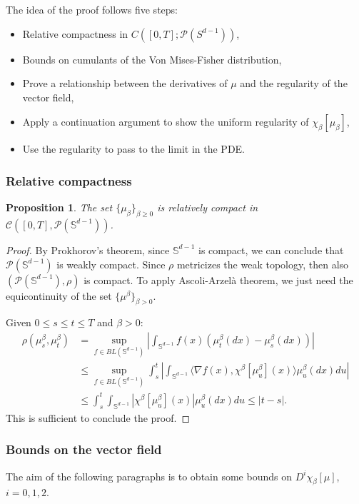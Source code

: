 \documentclass{article}
\numberwithin{theorem}{section}
\newtheorem{proposition}[theorem]{Proposition}
\begin{document}
The idea of the proof follows five steps:
\begin{itemize}
    \item Relative compactness in $C([0,T];\mathcal{P}(S^{d-1}))$,
    \item Bounds on cumulants of the Von Mises-Fisher distribution,
    \item Prove a relationship between the derivatives of $\mu$ and the regularity of the vector field,
    \item  Apply a continuation argument to show the uniform regularity of $\chi_\beta[\mu_\beta]$,
    \item Use the regularity to pass to the limit in the PDE.
\end{itemize}
\subsubsection{Relative compactness}
\begin{proposition}
\label{prop:rel_comp}
    The set $\{\mu_\beta\}_{\beta\geq 0}$ is relatively compact in $\mathcal{C}([0,T],\mathcal{P}(\mathbb{S}^{d-1}))$.
\end{proposition}
\begin{proof} By Prokhorov's theorem, since $\mathbb{S}^{d-1}$ is compact, we can conclude that $\mathcal{P}(\mathbb{S}^{d-1})$ is weakly compact. Since $\rho$ metricizes the weak topology, then also $(\mathcal{P}(\mathbb{S}^{d-1}), \rho)$ is compact.
To apply Ascoli-Arzel\`a theorem, we just need the equicontinuity of the set $\{\mu^\beta\}_{\beta>0}$.

Given $0\leq s\leq t\leq T$ and $\beta>0$:
\begin{align*}
\rho(\mu^\beta_s,\mu^\beta_t)&=\sup_{f\in BL(\mathbb{S}^{d-1})} \left|\int_{\mathbb{S}^{d-1}} f(x)(\mu^\beta_t(dx)-\mu^\beta_s(dx)) \right|\\
&\leq\sup_{f\in BL(\mathbb{S}^{d-1})} \int_s^t\left|\int_{\mathbb{S}^{d-1}} \langle \nabla f(x), \chi^\beta[\mu^\beta_u](x)\rangle \mu^\beta_u(dx) du\right| \\
&\leq \int_s^t \int_{\mathbb{S}^{d-1}}|\chi^\beta[\mu^\beta_u](x)|\mu^\beta_u(dx)du \leq |t-s|.
\end{align*}
This is sufficient to conclude the proof.
\end{proof}

\subsubsection{Bounds on the vector field}
The aim of the following paragraphs is to obtain some bounds on $D^i\chi_\beta[\mu]$, $i=0,1,2$.
\end{document}

